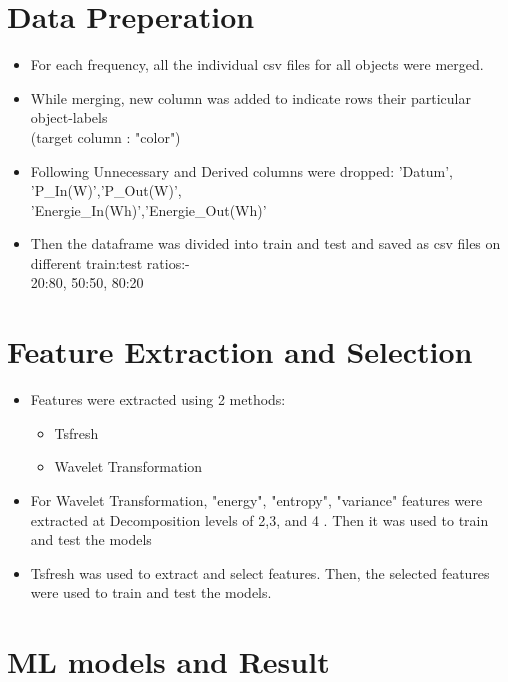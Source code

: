 \documentclass{article}
\begin{document}
\section{Data Preperation}
\begin{itemize}
    \item For each frequency, all the individual csv files for all objects were merged.
    \item While merging, new column was added to indicate rows their particular object-labels
    \\
    (target column : "color")
    \item Following Unnecessary and Derived columns were dropped: 'Datum', 'P\_In(W)','P\_Out(W)', \\ 'Energie\_In(Wh)','Energie\_Out(Wh)'
    \item Then the dataframe was divided into train and test and saved as csv files on different train:test ratios:- 
    \\
    20:80, 50:50, 80:20
\end{itemize}


\section{Feature Extraction and Selection}
\begin{itemize}
    \item Features were extracted using 2 methods:
    \begin{itemize}
        \item Tsfresh
        \item Wavelet Transformation
    \end{itemize}

    \item For Wavelet Transformation, "energy", "entropy", "variance" features were extracted at Decomposition levels of 2,3, and 4 . Then it was used to train and test the models
    \item Tsfresh was used to extract and select features. Then, the selected features were used to train and test the models.
    
\end{itemize}


\section{ML models and Result}
\end{document}
